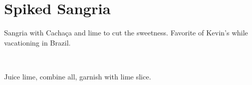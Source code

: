 \section[Spiked Sangria]{
    Spiked Sangria~
}

\begin{recipestats}[
        servings=1,
        preptime=5~\minute,
        original=Kevin \& Marina Green,
    ]
\end{recipestats}

\begin{recipeabstract}
    Sangria with Cacha\c{c}a and lime to cut the sweetness.
    Favorite of Kevin's while vacationing in Brazil.
\end{recipeabstract}

\begin{ingredientcolumns}
    \begin{ingredientblock}
        \\
    \end{ingredientblock}
    \begin{ingredientblock}
    \end{ingredientblock}
\end{ingredientcolumns}

\begin{preparation}
\item Juice lime, combine all, garnish with lime slice.
\end{preparation}

\recipeend%
